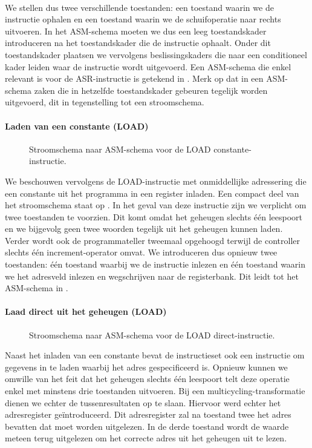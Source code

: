 \paragraph{}
We stellen dus twee verschillende toestanden: een toestand waarin we de instructie ophalen en een toestand waarin we de schuifoperatie naar rechts uitvoeren. In het ASM-schema moeten we dus een leeg toestandskader introduceren na het toestandskader die de instructie ophaalt. Onder dit toestandskader plaatsen we vervolgens beslissingskaders die naar een conditioneel kader leiden waar de instructie wordt uitgevoerd. Een ASM-schema die enkel relevant is voor de ASR-instructie is getekend in . Merk op dat in een ASM-schema zaken die in hetzelfde toestandskader gebeuren tegelijk worden uitgevoerd, dit in tegenstelling tot een stroomschema.
\paragraph{Laden van een constante (LOAD)}
\begin{figure}[hbt]
\centering
{}
\caption{Stroomschema naar ASM-schema voor de LOAD constante-instructie.}
\label{flowasm-load1}
\end{figure}
We beschouwen vervolgens de LOAD-instructie met onmiddellijke adressering die een constante uit het programma in een register inladen. Een compact deel van het stroomschema staat op . In het geval van deze instructie zijn we verplicht om twee toestanden te voorzien. Dit komt omdat het geheugen slechts \'e\'en leespoort en we bijgevolg geen twee woorden tegelijk uit het geheugen kunnen laden. Verder wordt ook de programmateller tweemaal opgehoogd terwijl de controller slechts \'e\'en increment-operator omvat. We introduceren dus opnieuw twee toestanden: \'e\'en toestand waarbij we de instructie inlezen en \'e\'en toestand waarin we het adresveld inlezen en wegschrijven naar de registerbank. Dit leidt tot het ASM-schema in .
\paragraph{Laad direct uit het geheugen (LOAD)}
\begin{figure}[hbt]
\centering
{}
\caption{Stroomschema naar ASM-schema voor de LOAD direct-instructie.}
\label{flowasm-load2}
\end{figure}
Naast het inladen van een constante bevat de instructieset ook een instructie om gegevens in te laden waarbij het adres gespecificeerd is. Opnieuw kunnen we omwille van het feit dat het geheugen slechts \'e\'en leespoort telt deze operatie enkel met minstens drie toestanden uitvoeren. Bij een multicycling-transformatie dienen we echter de tussenresultaten op te slaan. Hiervoor werd echter het adresregister ge\"introduceerd. Dit adresregister zal na toestand twee het adres bevatten dat moet worden uitgelezen. In de derde toestand wordt de waarde meteen terug uitgelezen om het correcte adres uit het geheugen uit te lezen.

